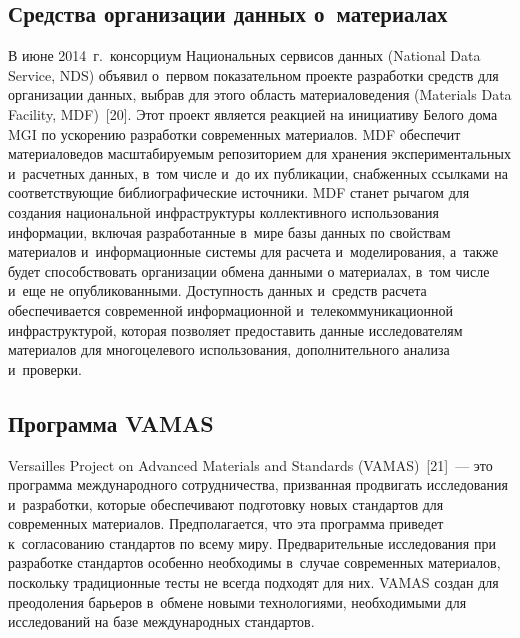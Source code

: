 \begin{multicols}{2}
\vspace*{-3pt}
  
\subsection{Средства организации данных о~материалах}

\vspace*{-1pt}
  
  В июне 2014~г.\ консорциум Национальных сервисов данных (National Data Service,
  NDS) объявил о~первом 
показательном проекте разработки средств для организации данных, выбрав для этого 
область материаловедения (Materials Data Facility,
MDF)~[20]. Этот проект является реакцией на инициативу 
Белого дома MGI по ускорению разработки современных материалов. MDF обеспечит 
материаловедов масштабируемым репозиторием для хранения экспериментальных 
и~расчетных данных, в~том числе и~до их публикации, снабженных ссылками на 
соответствующие библиографические источники. MDF станет рычагом для создания 
национальной инфраструктуры коллективного использования информации, включая 
разработанные в~мире базы данных по свойствам материалов и~информационные системы 
для расчета и~моделирования, а~также будет способствовать организации обмена данными 
о материалах, в~том числе и~еще не опубликованными. Доступность данных и~средств 
расчета обеспечивается современной информационной и~телекоммуникационной 
инфраструктурой, которая позволяет предоставить данные исследователям материалов для 
многоцелевого использования, дополнительного анализа и~проверки.

\vspace*{-3pt}

\subsection{Программа VAMAS}

\vspace*{-1pt}

  Versailles Project on Advanced Materials and Standards (VAMAS)~[21]~--- это программа 
международного сотрудничества, призванная продвигать исследования и~разработки, 
которые обеспечивают подготовку новых стандартов для современных материалов. 
Предполагается, что эта программа приведет к~согласованию стандартов по всему миру. 
Предварительные исследования при разработке стандартов особенно необходимы в~случае 
современных материалов, поскольку традиционные тес\-ты не всегда подходят для них. 
VAMAS создан для преодоления барьеров в~обмене новыми технологиями, необходимыми 
для исследований на базе международных стандартов.


\end{multicols}
